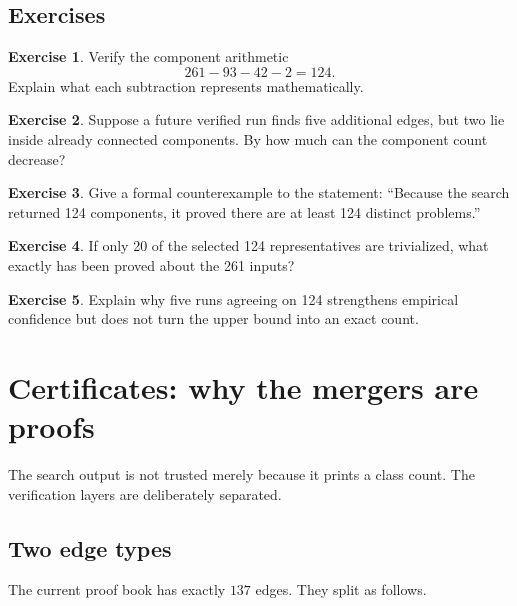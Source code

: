 \documentclass[11pt]{article}
\theoremstyle{definition}
\newtheorem{exercise}{Exercise}[section]
\theoremstyle{remark}
\begin{document}
\subsection*{Exercises}

\begin{exercise}
Verify the component arithmetic
\[
261-93-42-2=124.
\]
Explain what each subtraction represents mathematically.
\end{exercise}

\begin{exercise}
Suppose a future verified run finds five additional edges, but two lie
inside already connected components.  By how much can the component count
decrease?
\end{exercise}

\begin{exercise}
Give a formal counterexample to the statement:
``Because the search returned 124 components, it proved there are at least
124 distinct problems.''
\end{exercise}

\begin{exercise}
If only 20 of the selected 124 representatives are trivialized, what
exactly has been proved about the 261 inputs?
\end{exercise}

\begin{exercise}
Explain why five runs agreeing on 124 strengthens empirical confidence but
does not turn the upper bound into an exact count.
\end{exercise}

\section{Certificates: why the mergers are proofs}
\label{sec:certificates}

The search output is not trusted merely because it prints a class count.
The verification layers are deliberately separated.

\subsection{Two edge types}

The current proof book has exactly \(137\) edges.  They split as follows.
\end{document}

